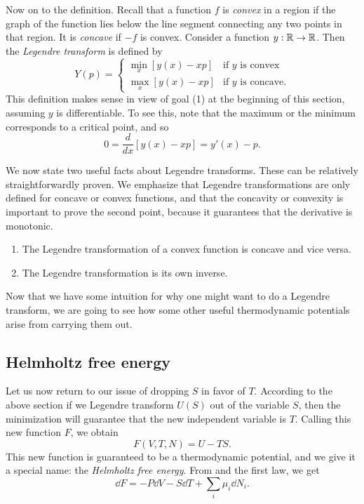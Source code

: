 Now on to the definition. Recall that a function $f$ is {\it convex}
 in a region if the graph of the function lies 
below the line segment connecting any two points in that region. It is 
{\it concave} if $-f$ is convex. Consider
a function $y:\mathbb{R}\to\mathbb{R}$. Then the 
{\it Legendre transform} is defined by
\begin{equation}
Y(p)=\begin{cases}
  \min_x [y(x)-xp] & \text{if $y$ is convex}\\
  \max_x [y(x)-xp] & \text{if $y$ is concave.}
\end{cases}
\end{equation}
This definition makes sense in view of goal (1) at the beginning of this
section, assuming $y$ is differentiable. To see this, note that the maximum
or the minimum corresponds to a critical point, and so
\begin{equation}\label{eq:legendremin}
  0=\frac{d}{dx}\left[y(x)-xp\right]=y'(x)-p.
\end{equation}

We now state two useful facts about Legendre transforms. These can
be relatively straightforwardly proven. We emphasize that Legendre
transformations are only defined for concave or convex functions, and
that the concavity or convexity is important to prove the second point,
because it guarantees that the derivative is monotonic.
\begin{proposition}{}{}
  \begin{enumerate}
    \item The Legendre transformation of a convex function is concave
          and vice versa.
    \item The Legendre transformation is its own inverse.
  \end{enumerate}
\end{proposition}

Now that we have some intuition for why one might want to do a
Legendre transform, we are going to see how some other useful
thermodynamic potentials arise from carrying them out.

\subsection{Helmholtz free energy}
Let us now return to our issue of dropping $S$ in favor
of $T$. According to the above section if we
Legendre transform $U(S)$ out of the variable $S$, then the minimization
will guarantee that the new independent variable is $T$. Calling
this new function $F$, we obtain
\begin{equation}\label{eq:helmholtz}
  F(V,T,N)=U-TS.
\end{equation}
This new function is guaranteed to be a thermodynamic potential, and
we give it a special name: the {\it Helmholtz free energy}.
From  and the first law, we get
\begin{equation}\label{eq:helmholtz1st}
  \dd F = -P\dd{V} -S\dd{T} +\sum_i\mu_i\dd{N}_i.
\end{equation}

